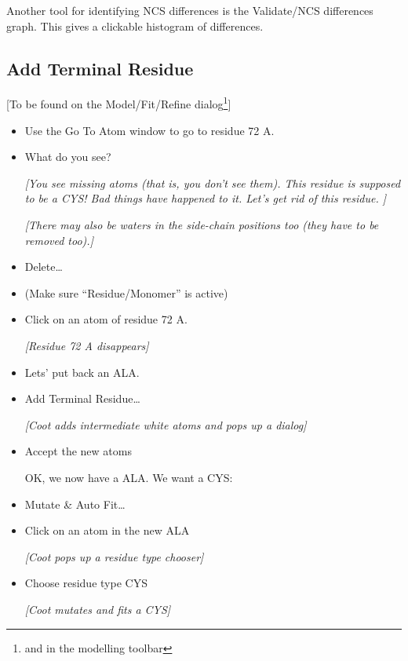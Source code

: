 \documentclass{article}
\begin{document}
Another tool for identifying NCS differences is the
\textsf{Validate/NCS differences} graph. This gives a clickable
histogram of differences.


\subsection{Add Terminal Residue}
[To be found on the Model/Fit/Refine dialog\footnote{and in the 
  modelling toolbar}]

\begin{itemize}
\item Use the Go To Atom window to go to residue 72 A.

\item What do you see?
  
  \emph{[You see missing atoms (that is, you don't see them).  This residue
  is supposed to be a CYS!  Bad things have happened to it.  Let's get
  rid of this residue. ]}
  
  \emph{[There may also be waters in the side-chain positions too (they have
  to be removed too).]} 

\item \textsf{Delete\ldots}

\item (Make sure ``Residue/Monomer'' is active)

\item Click on an atom of residue 72 A.

\textsl{  [Residue 72 A disappears]}

\item Lets' put back an ALA.

\item \textsf{Add Terminal Residue\ldots}

\textsl{  [Coot adds intermediate white atoms and pops up a dialog]}

\item \textsf{Accept} the new atoms

OK, we now have a ALA.  We want a CYS:

\item \textsf{Mutate \& Auto Fit\ldots}

\item Click on an atom in the new ALA

\textsl{  [Coot pops up a residue type chooser]}

\item Choose residue type \textsf{CYS}

\textsl{  [Coot mutates and fits a CYS]}


\end{itemize}
\end{document}
